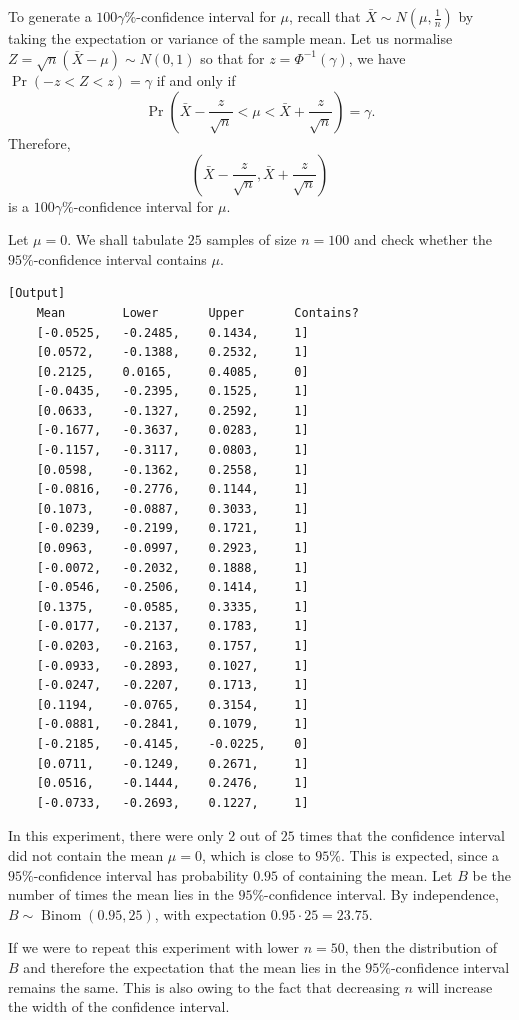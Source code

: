 \documentclass{article}
\newcommand{\pr}{\mathop{\mathrm{Pr}}}
\begin{document}
To generate a \(100\gamma\%\)-confidence interval for \(\mu\), recall that \(\bar{X} \sim N(\mu, \frac{1}{n})\) by taking the expectation or variance of the sample mean. Let us normalise \(Z = \sqrt{n}(\bar{X} - \mu) \sim N(0,1)\) so that for \(z = \Phi^{-1}(\gamma)\), we have \(\pr(-z < Z < z) = \gamma\) if and only if 
\[ \pr\left(\bar{X} - \frac{z}{\sqrt{n}} < \mu < \bar{X} + \frac{z}{\sqrt{n}}\right) = \gamma. \]
Therefore,
\[ \left(\bar{X} - \frac{z}{\sqrt{n}}, \bar{X} + \frac{z}{\sqrt{n}}\right) \] 
is a \(100\gamma\%\)-confidence interval for \(\mu\).

Let \(\mu = 0\). We shall tabulate \(25\) samples of size \(n = 100\) and check whether the \(95\%\)-confidence interval contains \(\mu\).

\begin{verbatim}[Output]
    Mean        Lower       Upper       Contains?
    [-0.0525,   -0.2485,    0.1434,     1]
    [0.0572,    -0.1388,    0.2532,     1]
    [0.2125,    0.0165,     0.4085,     0]
    [-0.0435,   -0.2395,    0.1525,     1]
    [0.0633,    -0.1327,    0.2592,     1]
    [-0.1677,   -0.3637,    0.0283,     1]
    [-0.1157,   -0.3117,    0.0803,     1]
    [0.0598,    -0.1362,    0.2558,     1]
    [-0.0816,   -0.2776,    0.1144,     1]
    [0.1073,    -0.0887,    0.3033,     1]
    [-0.0239,   -0.2199,    0.1721,     1]
    [0.0963,    -0.0997,    0.2923,     1]
    [-0.0072,   -0.2032,    0.1888,     1]
    [-0.0546,   -0.2506,    0.1414,     1]
    [0.1375,    -0.0585,    0.3335,     1]
    [-0.0177,   -0.2137,    0.1783,     1]
    [-0.0203,   -0.2163,    0.1757,     1]
    [-0.0933,   -0.2893,    0.1027,     1]
    [-0.0247,   -0.2207,    0.1713,     1]
    [0.1194,    -0.0765,    0.3154,     1]
    [-0.0881,   -0.2841,    0.1079,     1]
    [-0.2185,   -0.4145,    -0.0225,    0]
    [0.0711,    -0.1249,    0.2671,     1]
    [0.0516,    -0.1444,    0.2476,     1]
    [-0.0733,   -0.2693,    0.1227,     1]
\end{verbatim}
In this experiment, there were only \(2\) out of \(25\) times that the confidence interval did not contain the mean \(\mu = 0\), which is close to \(95\%\). This is expected, since a \(95\%\)-confidence interval has probability \(0.95\) of containing the mean. Let \(B\) be the number of times the mean lies in the \(95\%\)-confidence interval. By independence, \(B \sim \mathop{\mathrm{Binom}}(0.95,25)\), with expectation \(0.95 \cdot 25 = 23.75\). 

If we were to repeat this experiment with lower \(n = 50\), then the distribution of \(B\) and therefore the expectation that the mean lies in the \(95\%\)-confidence interval remains the same. This is also owing to the fact that decreasing \(n\) will increase the width of the confidence interval.
\end{document}
